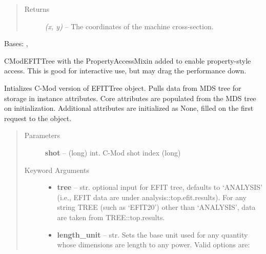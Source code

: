 \documentclass[letterpaper,10pt,english]{sphinxmanual}
\begin{document}
\begin{fulllineitems}
\begin{fulllineitems}
\begin{quote}
\begin{description}
\item[{Returns}] \leavevmode
\emph{(x, y)} --
The coordinates of the machine cross-section.

\end{description}\end{quote}

\end{fulllineitems}


\end{fulllineitems}


\begin{fulllineitems}
\label{eqtools:eqtools.CModEFIT.CModEFITTreeProp}
Bases: {\hyperref[eqtools:eqtools.CModEFIT.CModEFITTree]{}}, {\hyperref[eqtools:eqtools.core.PropertyAccessMixin]{}}

CModEFITTree with the PropertyAccessMixin added to enable property-style
access. This is good for interactive use, but may drag the performance down.

Intializes C-Mod version of EFITTree object.  Pulls data from MDS tree for storage
in instance attributes.  Core attributes are populated from the MDS tree on initialization.
Additional attributes are initialized as None, filled on the first request to the object.
\begin{quote}\begin{description}
\item[{Parameters }] \leavevmode
\textbf{shot} --
(long) int. C-Mod shot index (long)

\item[{Keyword Arguments}] \leavevmode\begin{itemize}
\item {} 
\textbf{tree} --
str. optional input for EFIT tree, defaults to `ANALYSIS'
(i.e., EFIT data are under analysis::top.efit.results).
For any string TREE (such as `EFIT20') other than `ANALYSIS',
data are taken from TREE::top.results.

\item {} 
\textbf{length\_unit} --
str. Sets the base unit used for any quantity whose
dimensions are length to any power. Valid options are:
\begin{quote}


\end{quote}
\end{itemize}
\end{description}
\end{quote}
\end{fulllineitems}
\end{document}
